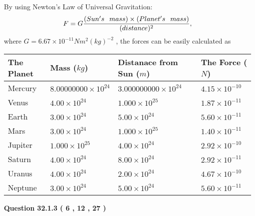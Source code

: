 \documentclass[12pt]{article}
\begin{document}
  
 
 

By using Newton's Law of Universal Gravitation:
\[
F=G \frac{(Sun's \hspace{0.1in} mass) \times (Planet's \hspace{0.1in} mass)} { (distance)^2},
\]
where
$ G= %
6.67 \times 10^{-11}N m^{2}(kg)^{-2}$ , the forces can be easily calculated as
 
\vspace{0.2in}
 
 
\begin{tabular}{|l|l|l|l|}
\hline
The Planet & Mass ($kg$) & Distanace from Sun ($m$) & The Force ($N$)\\
\hline
Mercury  &
           $ %
8.00000000 \times 10^{24} $   &
             $ %
3.000000000 \times 10^{24} $    & $ %
4.15 \times 10^{-10} $
\\  \hline
Venus    &
           $  %
4.00 \times 10^{24}  $     &
             $ %
1.000 \times 10^{25} $    & $ %
1.87 \times 10^{-11} $
\\  \hline
Earth    &
           $  %
3.00 \times 10^{24}  $     &
             $ %
5.00 \times 10^{24} $    & $ %
5.60 \times 10^{-11} $
\\   \hline
Mars     &
           $  %
3.00 \times 10^{24} $     &
             $ %
1.000 \times 10^{25} $    & $ %
1.40 \times 10^{-11} $
\\   \hline
Jupiter  &
           $  %
1.000 \times 10^{25} $    &
             $ %
4.00 \times 10^{24} $    & $ %
2.92 \times 10^{-10} $
\\  \hline
Saturn   &
           $  %
4.00 \times 10^{24} $    &
             $ %
8.00 \times 10^{24}  $    & $ %
2.92 \times 10^{-11} $
\\  \hline
Uranus   &
           $  %
4.00 \times 10^{24} $    &
             $ %
2.00 \times 10^{24} $    & $ %
4.67 \times 10^{-10} $
\\  \hline
Neptune  &
           $  %
3.00 \times 10^{24} $    &
             $ %
5.00 \times 10^{24} $    & $ %
5.60 \times 10^{-11} $
\\  \hline
 
\end{tabular}
 
 
 
 
  
\vspace{0.2in}
  
{\textbf{\Large{Question
32.1.3 
 (           6 ,          12 ,          27 )
}}}
  
\end{document}
